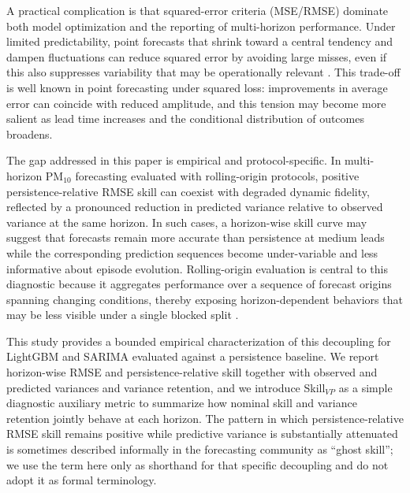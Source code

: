 \documentclass{article}
\begin{document}
A practical complication is that squared-error criteria (MSE/RMSE) dominate
both model optimization and the reporting of multi-horizon performance.
Under limited predictability, point forecasts that shrink toward a central
tendency and dampen fluctuations can reduce squared error by avoiding large
misses, even if this also suppresses variability that may be operationally
relevant \citep{gneiting2011}.
This trade-off is well known in point forecasting under squared loss:
improvements in average error can coincide with reduced amplitude, and this
tension may become more salient as lead time increases and the conditional
distribution of outcomes broadens.

The gap addressed in this paper is empirical and protocol-specific.
In multi-horizon PM$_{10}$ forecasting evaluated with rolling-origin protocols,
positive persistence-relative RMSE skill can coexist with degraded dynamic
fidelity, reflected by a pronounced reduction in predicted variance relative to
observed variance at the same horizon.
In such cases, a horizon-wise skill curve may suggest that forecasts remain
more accurate than persistence at medium leads while the corresponding
prediction sequences become under-variable and less informative about episode
evolution.
Rolling-origin evaluation is central to this diagnostic because it aggregates
performance over a sequence of forecast origins spanning changing conditions,
thereby exposing horizon-dependent behaviors that may be less visible under a
single blocked split \citep{tashman2000}.

This study provides a bounded empirical characterization of this decoupling
for LightGBM and SARIMA evaluated against a persistence baseline.
We report horizon-wise RMSE and persistence-relative skill together with
observed and predicted variances and variance retention, and we introduce
Skill$_{VP}$ as a simple diagnostic auxiliary metric to summarize how nominal
skill and variance retention jointly behave at each horizon.
The pattern in which persistence-relative RMSE skill remains positive while
predictive variance is substantially attenuated is sometimes described
informally in the forecasting community as ``ghost skill''; we use the term
here only as shorthand for that specific decoupling and do not adopt it as
formal terminology.
\end{document}
